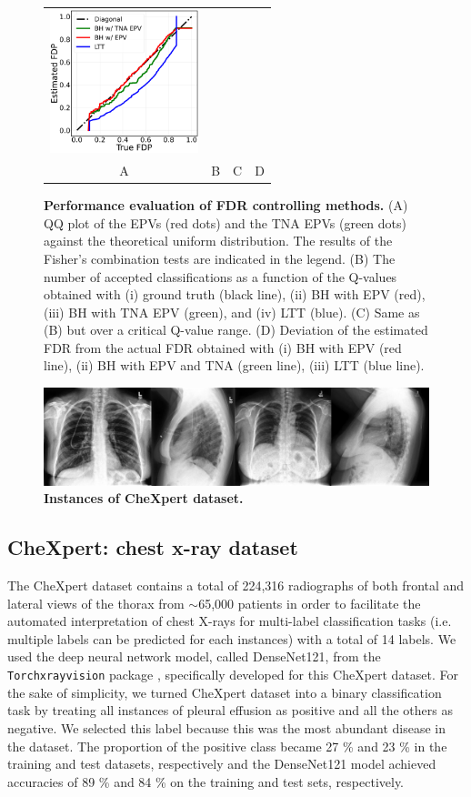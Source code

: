 \documentclass{article}
\begin{document}
\begin{figure}[h!]
\begin{tabular}{cccc}
		\includegraphics[width=1.7in]{img/cnn_FDPscat_chx_balanced.png}\\
		A & B & C & D
	\end{tabular}
	\caption{{\bf Performance evaluation of FDR controlling methods.} (A) QQ plot of the EPVs (red dots) and the TNA EPVs (green dots) against the theoretical uniform distribution. The results of the Fisher's combination tests are indicated in the legend. (B) The number of accepted classifications as a function of the Q-values obtained with (i) ground truth (black line), (ii) BH with EPV (red), (iii) BH with TNA EPV (green), and (iv) LTT (blue). (C) Same as (B) but over a critical Q-value range. (D) Deviation of the estimated FDR from the actual FDR obtained with (i) BH with EPV (red line), (ii) BH with EPV and TNA (green line), (iii) LTT (blue line).}
	\label{fig:I}
\end{figure} 

\begin{figure}[h!]
	\centering
	\includegraphics[width=5.in]{img/chx.png}
	\caption{{\bf Instances of CheXpert dataset.}}
	\label{fig:pcam_example}
\end{figure} 

\subsection{CheXpert: chest x-ray dataset}

The CheXpert dataset contains a total of 224,316 radiographs of both frontal and lateral views of the thorax from $\sim$65,000 patients in order to facilitate the automated interpretation of chest X-rays for multi-label classification tasks (i.e. multiple labels can be predicted for each instances) with a total of 14 labels. We used the deep neural network model, called DenseNet121, from the \texttt{Torchxrayvision} package \cite{cohen2020limits,Cohen2022xrv}, specifically developed for this CheXpert dataset. For the sake of simplicity, we turned CheXpert dataset into a binary classification task by treating all instances of pleural effusion as positive and all the others as negative. We selected this label because this was the most abundant disease in the dataset. The proportion of the positive class became 27 \% and 23 \% in the training and test datasets, respectively and the DenseNet121 model achieved accuracies of 89 \% and 84 \% on the training and test sets, respectively.
\end{document}
